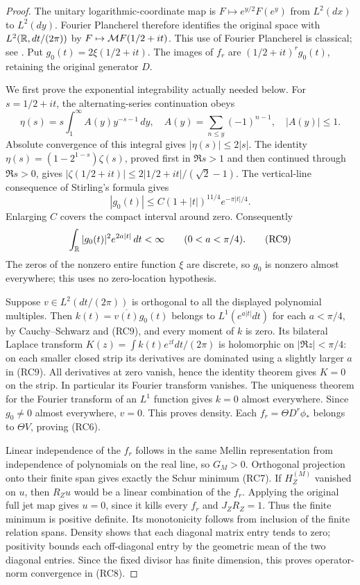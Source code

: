 \documentclass[11pt]{article}
\begin{document}
\begin{proof}
The unitary logarithmic-coordinate map is
$F\mapsto e^{y/2}F(e^y)$ from $L^2(dx)$ to $L^2(dy)$.
Fourier Plancherel therefore identifies the original space with
$L^2(\mathbb R,dt/(2\pi))$ by $F\mapsto\mathcal M F(1/2+it)$.
This use of Fourier Plancherel is classical; see \cite{SteinFourier}.
Put $g_0(t)=2\xi(1/2+it)$. The images of $f_r$ are
$(1/2+it)^rg_0(t)$, retaining the original generator $D$.

We first prove the exponential integrability actually needed below.
For $s=1/2+it$, the alternating-series continuation obeys
\[
 \eta(s)=s\int_1^\infty A(y)y^{-s-1}\,dy,
 \quad A(y)=\sum_{n\le y}(-1)^{n-1},\quad |A(y)|\le1.
\]
Absolute convergence of this integral gives $|\eta(s)|\le2|s|$.
The identity $\eta(s)=(1-2^{1-s})\zeta(s)$, proved first in
$\Re s>1$ and then continued through $\Re s>0$, gives
$|\zeta(1/2+it)|\le2|1/2+it|/(\sqrt2-1)$.
The vertical-line consequence of Stirling's formula
\cite[5.11.3]{DLMFStirling} gives
\[
 |g_0(t)|\le C(1+|t|)^{11/4}e^{-\pi|t|/4}.
\]
Enlarging $C$ covers the compact interval around zero. Consequently
\[
 \int_\mathbb R |g_0(t)|^2e^{2a|t|}\,dt<\infty
 \qquad(0<a<\pi/4).
 \tag{RC9}
\]
The zeros of the nonzero entire function $\xi$ are discrete, so
$g_0$ is nonzero almost everywhere; this uses no zero-location
hypothesis.

Suppose $v\in L^2(dt/(2\pi))$ is orthogonal to all the displayed
polynomial multiples. Then $k(t)=\overline{v(t)}g_0(t)$ belongs
to $L^1(e^{a|t|}dt)$ for each $a<\pi/4$, by Cauchy--Schwarz
and (RC9), and every moment of $k$ is zero. Its bilateral Laplace
transform $K(z)=\int k(t)e^{zt}dt/(2\pi)$ is holomorphic on
$|\Re z|<\pi/4$: on each smaller closed strip its derivatives
are dominated using a slightly larger $a$ in (RC9).
All derivatives at zero vanish, hence the identity theorem gives
$K=0$ on the strip. In particular its Fourier transform vanishes.
The uniqueness theorem for the Fourier transform of an $L^1$
function \cite{SteinFourier} gives $k=0$ almost everywhere.
Since $g_0\ne0$ almost everywhere, $v=0$. This proves density.
Each $f_r=\Theta D^r\phi_*$ belongs to $\Theta V$, proving (RC6).

Linear independence of the $f_r$ follows in the same Mellin
representation from independence of polynomials on the real line,
so $G_M>0$. Orthogonal projection onto their finite span gives
exactly the Schur minimum (RC7). If $H_Z^{(M)}$ vanished on
$u$, then $R_Zu$ would be a linear combination of the $f_r$.
Applying the original full jet map gives $u=0$, since it kills
every $f_r$ and $J_ZR_Z=1$. Thus the finite minimum is positive
definite. Its monotonicity follows from inclusion of the finite
relation spans. Density shows that each diagonal matrix entry
tends to zero; positivity bounds each off-diagonal entry by the
geometric mean of the two diagonal entries. Since the fixed
divisor has finite dimension, this proves operator-norm convergence
in (RC8).
\end{proof}
\end{document}
